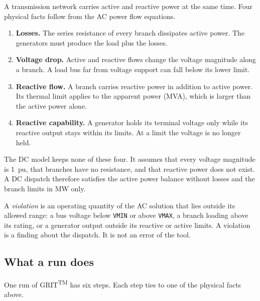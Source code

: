\documentclass[a4paper,11pt]{article}
\newcommand{\TM}{\textsuperscript{TM}}
\newcommand{\GRIT}{GRIT\TM}
\begin{document}
A transmission network carries active and reactive power at the same time. Four physical facts follow from the AC power flow equations.

\begin{enumerate}[nosep]
  \item \textbf{Losses.} The series resistance of every branch dissipates active power. The generators must produce the load plus the losses.
  \item \textbf{Voltage drop.} Active and reactive flows change the voltage magnitude along a branch. A load bus far from voltage support can fall below its lower limit.
  \item \textbf{Reactive flow.} A branch carries reactive power in addition to active power. Its thermal limit applies to the apparent power (MVA), which is larger than the active power alone.
  \item \textbf{Reactive capability.} A generator holds its terminal voltage only while its reactive output stays within its limits. At a limit the voltage is no longer held.
\end{enumerate}

The DC model keeps none of these four. It assumes that every voltage magnitude is 1~pu, that branches have no resistance, and that reactive power does not exist. A DC dispatch therefore satisfies the active power balance without losses and the branch limits in MW only.

\begin{notebox}[title={What ``violation'' means in this manual}]
A \emph{violation} is an operating quantity of the AC solution that lies outside its allowed range: a bus voltage below \texttt{VMIN} or above \texttt{VMAX}, a branch loading above its rating, or a generator output outside its reactive or active limits. A violation is a finding about the dispatch. It is not an error of the tool.
\end{notebox}

\subsection{What a run does}\label{sec:whatrun}

One run of \GRIT{} has six steps. Each step ties to one of the physical facts above.
\end{document}

